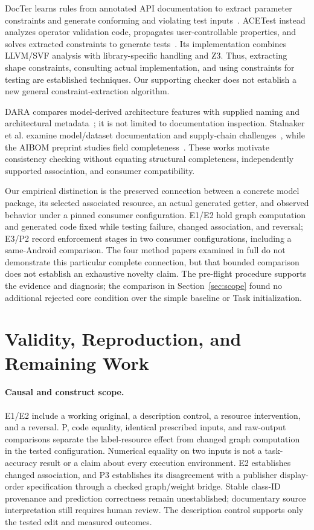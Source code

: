 \documentclass[10pt,twocolumn,letterpaper]{article}
\begin{document}
DocTer learns rules from annotated API documentation to extract parameter constraints and generate conforming and violating test inputs~\cite{docter}. ACETest instead analyzes operator validation code, propagates user-controllable properties, and solves extracted constraints to generate tests~\cite{acetest}. Its implementation combines LLVM/SVF analysis with library-specific handling and Z3. Thus, extracting shape constraints, consulting actual implementation, and using constraints for testing are established techniques. Our supporting checker does not establish a new general constraint-extraction algorithm.

DARA compares model-derived architecture features with supplied naming and architectural metadata~\cite{dara}; it is not limited to documentation inspection. Stalnaker et al. examine model/dataset documentation and supply-chain challenges~\cite{stalnaker}, while the AIBOM preprint studies field completeness~\cite{aibom}. These works motivate consistency checking without equating structural completeness, independently supported association, and consumer compatibility.

Our empirical distinction is the preserved connection between a concrete model package, its selected associated resource, an actual generated getter, and observed behavior under a pinned consumer configuration. E1/E2 hold graph computation and generated code fixed while testing failure, changed association, and reversal; E3/P2 record enforcement stages in two consumer configurations, including a same-Android comparison. The four method papers examined in full do not demonstrate this particular complete connection, but that bounded comparison does not establish an exhaustive novelty claim. The pre-flight procedure supports the evidence and diagnosis; the comparison in Section~\ref{sec:scope} found no additional rejected core condition over the simple baseline or Task initialization.

\section{Validity, Reproduction, and Remaining Work}
\paragraph{Causal and construct scope.}
E1/E2 include a working original, a description control, a resource intervention, and a reversal. P, code equality, identical prescribed inputs, and raw-output comparisons separate the label-resource effect from changed graph computation in the tested configuration. Numerical equality on two inputs is not a task-accuracy result or a claim about every execution environment. E2 establishes changed association, and P3 establishes its disagreement with a publisher display-order specification through a checked graph/weight bridge. Stable class-ID provenance and prediction correctness remain unestablished; documentary source interpretation still requires human review. The description control supports only the tested edit and measured outcomes.
\end{document}
